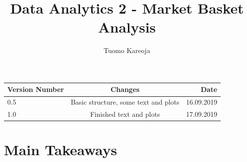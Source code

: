 \documentclass[12pt,a4paper,leqno]{report}
\title{Data Analytics 2 - Market Basket Analysis}
\author{Tuomo Kareoja}
\date{}
\theoremstyle{plain}
\theoremstyle{definition}
\theoremstyle{remark}
\begin{document}
\maketitle

\begin{table}[h!]
  \begin{center}
    \begin{tabular}{l|c|r}
      \textbf{Version Number} & \textbf{Changes} & \textbf{Date} \\
      \hline
      0.5 & Basic structure, some text and plots & 16.09.2019\\
      1.0 & Finished text and plots & 17.09.2019\\
    \end{tabular}
  \end{center}
\end{table}

\newpage

\section{Main Takeaways}
\end{document}

